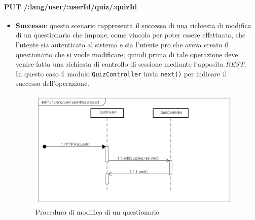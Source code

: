 \paragraph{PUT /:lang/user/:userId/quiz/:quizId} %
\begin{itemize}
\item \textbf{Successo}: questo scenario rappresenta il successo di una richiesta di modifica di un questionario che impone, come vincolo per poter essere effettuata, che l'utente sia autenticato al sistema e sia l'utente pro che aveva creato il questionario che si vuole modificare; quindi prima di tale operazione deve venire fatta una richiesta di controllo di sessione mediante l'apposita \textit{REST}. In questo caso il modulo \texttt{QuizController} invia \texttt{next()} per indicare il successo dell'operazione.
\label{Procedura di modifica di un questionario}
\begin{figure}[ht]
	\centering
	\includegraphics[scale=0.40]{UML/DiagrammiDiSequenza/Back-end/PUT__lang_user_userId_quiz_quizId_success.png}
	\caption{Procedura di modifica di un questionario}
\end{figure}
\FloatBarrier


\end{itemize}
